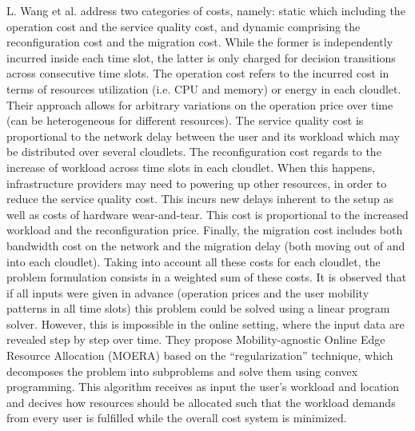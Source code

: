 \noindent\tab L. Wang \cite{wang2018moera} et al. address two categories of costs, namely: static which including the operation cost and the service quality cost, and dynamic comprising the reconfiguration cost and the migration cost. While the former is independently incurred inside each time slot, the latter is only charged for decision transitions across consecutive time slots. The operation cost refers to the incurred cost in terms of resources utilization (i.e. CPU and memory) or energy in each cloudlet. Their approach allows for arbitrary variations on the operation price over time (can be heterogeneous for different resources). The service quality cost is proportional to the network delay between the user and its workload which may be distributed over several cloudlets. The reconfiguration cost regards to the increase of workload across time slots in each cloudlet. When this happens, infrastructure providers may need to powering up other resources, in order to reduce the service quality cost. This incurs new delays inherent to the setup as well as costs of hardware wear-and-tear. This cost is proportional to the increased workload and the reconfiguration price. Finally, the migration cost includes both bandwidth cost on the network and the migration delay (both moving out of and into each cloudlet). Taking into account all these costs for each cloudlet, the problem formulation consists in a weighted sum of these costs. It is observed that if all inputs were given in advance (operation prices and the user mobility patterns in all time slots) this problem could be solved using a linear program solver. However, this is impossible in the online setting, where
the input data are revealed step by step over time. They propose Mobility-agnostic Online Edge Resource Allocation (MOERA) based on the ``regularization'' technique, which decomposes the problem into subproblems and solve them using convex programming. This algorithm receives as input the user’s workload and location and decives how resources should be allocated such that the workload demands from every user is fulfilled while the overall cost system is minimized.

